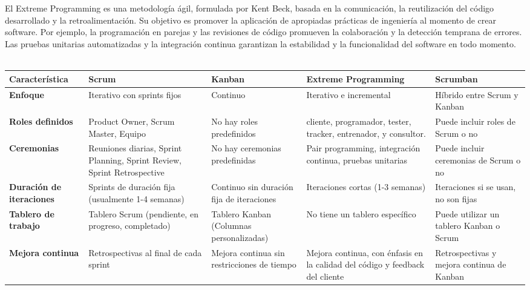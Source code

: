 \\
\\
El Extreme Programming es una metodología ágil, formulada por Kent Beck, basada en la comunicación, la reutilización del código desarrollado y la retroalimentación. Su objetivo es promover la aplicación de apropiadas prácticas de ingeniería al momento de crear software. Por ejemplo, la programación en parejas y las revisiones de código promueven la colaboración y la detección temprana de errores. Las pruebas unitarias automatizadas y la integración continua garantizan la estabilidad y la funcionalidad del software en todo momento.  
\\
\\
\begin{table}[H]
    \centering
    \footnotesize
    \setlength{\tabcolsep}{3pt} 
    \renewcommand{\arraystretch}{1.2}
    \begin{tabular}{| m{2.5cm} | m{2.8cm} | m{2.8cm} | m{2.8cm} | m{2.8cm} |}
        \hline
        \textbf{Característica} & \textbf{Scrum} & \textbf{Kanban} & \textbf{Extreme Programming} & \textbf{Scrumban} \\
        \hline
        \textbf{Enfoque} & Iterativo con sprints fijos & Continuo & Iterativo e incremental & Híbrido entre Scrum y Kanban \\
        \hline
        \textbf{Roles definidos} & Product Owner, Scrum Master, Equipo & No hay roles predefinidos & cliente, programador, tester, tracker, entrenador, y consultor. & Puede incluir roles de Scrum o no \\
        \hline
        \textbf{Ceremonias} & Reuniones diarias, Sprint Planning, Sprint Review, Sprint Retrospective & No hay ceremonias predefinidas & Pair programming, integración continua, pruebas unitarias & Puede incluir ceremonias de Scrum o no \\
        \hline
        \textbf{Duración de iteraciones} & Sprints de duración fija (usualmente 1-4 semanas) & Continuo sin duración fija de iteraciones & Iteraciones cortas (1-3 semanas) & Iteraciones si se usan, no son fijas \\
        \hline
        \textbf{Tablero de trabajo} & Tablero Scrum (pendiente, en progreso, completado) & Tablero Kanban (Columnas personalizadas) & No tiene un tablero específico & Puede utilizar un tablero Kanban o Scrum \\
        \hline
        \textbf{Mejora continua} & Retrospectivas al final de cada sprint & Mejora continua sin restricciones de tiempo & Mejora continua, con énfasis en la calidad del código y feedback del cliente & Retrospectivas y mejora continua de Kanban \\

\end{tabular}
\end{table}
